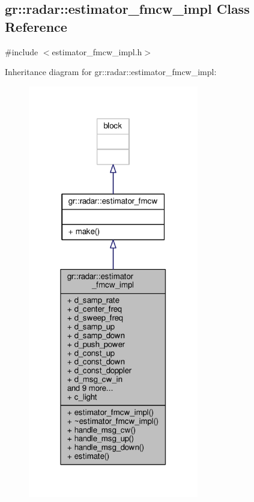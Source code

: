 \subsection{gr\+:\+:radar\+:\+:estimator\+\_\+fmcw\+\_\+impl Class Reference}
\label{classgr_1_1radar_1_1estimator__fmcw__impl}


{\ttfamily \#include $<$estimator\+\_\+fmcw\+\_\+impl.\+h$>$}



Inheritance diagram for gr\+:\+:radar\+:\+:estimator\+\_\+fmcw\+\_\+impl\+:
\nopagebreak
\begin{figure}[H]
\begin{center}
\leavevmode
\includegraphics[width=211pt]{d2/dd1/classgr_1_1radar_1_1estimator__fmcw__impl__inherit__graph}
\end{center}
\end{figure}


